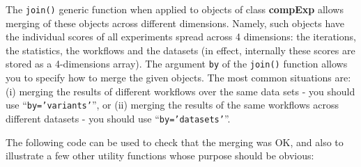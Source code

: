 \documentclass[10pt,a4paper]{article}\usepackage[]{graphicx}\usepackage[]{color}
\begin{document}
The \texttt{join()} generic function when applied to objects of class
\textbf{compExp} allows merging of these objects across different
dimensions. Namely, such objects have the individual scores of all
experiments spread across 4 dimensions: the iterations, the
statistics, the workflows and the datasets (in effect, internally
these scores are stored as a 4-dimensions array). The argument
\texttt{by} of the \texttt{join()} function allows you to specify how
to merge the given objects. The most common situations are: (i)
merging the results of different workflows over the same data sets -
you should use ``\texttt{by='variants'}'', or (ii) merging the results
of the same workflows across different datasets - you should use
``\texttt{by='datasets'}''.

The following code can be used to check that the merging was OK, and
also to illustrate a few other utility functions whose purpose should
be obvious:
\end{document}
